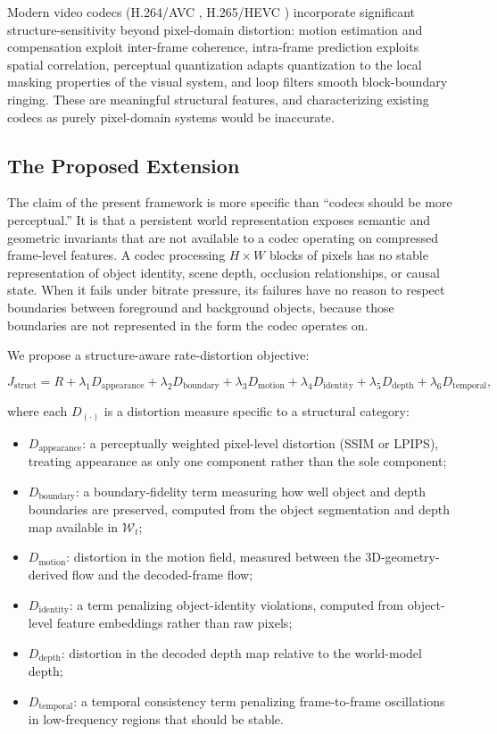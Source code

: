 \documentclass[12pt,a4paper]{article}
\theoremstyle{plain}
\theoremstyle{definition}
\theoremstyle{remark}
\begin{document}
Modern video codecs (H.264/AVC \cite{wiegand2003}, H.265/HEVC \cite{sullivan2012}) incorporate significant structure-sensitivity beyond pixel-domain distortion: motion estimation and compensation exploit inter-frame coherence, intra-frame prediction exploits spatial correlation, perceptual quantization adapts quantization to the local masking properties of the visual system, and loop filters smooth block-boundary ringing. These are meaningful structural features, and characterizing existing codecs as purely pixel-domain systems would be inaccurate.

\subsection{The Proposed Extension}

The claim of the present framework is more specific than ``codecs should be more perceptual.'' It is that a persistent world representation exposes semantic and geometric invariants that are not available to a codec operating on compressed frame-level features. A codec processing $H \times W$ blocks of pixels has no stable representation of object identity, scene depth, occlusion relationships, or causal state. When it fails under bitrate pressure, its failures have no reason to respect boundaries between foreground and background objects, because those boundaries are not represented in the form the codec operates on.

We propose a structure-aware rate-distortion objective:

\[
J_{\mathrm{struct}} = R + \lambda_1 D_{\mathrm{appearance}} + \lambda_2 D_{\mathrm{boundary}} + \lambda_3 D_{\mathrm{motion}} + \lambda_4 D_{\mathrm{identity}} + \lambda_5 D_{\mathrm{depth}} + \lambda_6 D_{\mathrm{temporal}},
\]

where each $D_{\mathrm{(\cdot)}}$ is a distortion measure specific to a structural category:

\begin{itemize}[leftmargin=2em,itemsep=2pt]
\item $D_{\mathrm{appearance}}$: a perceptually weighted pixel-level distortion (SSIM \cite{wang2004ssim} or LPIPS), treating appearance as only one component rather than the sole component;
\item $D_{\mathrm{boundary}}$: a boundary-fidelity term measuring how well object and depth boundaries are preserved, computed from the object segmentation and depth map available in $\mathcal{W}_t$;
\item $D_{\mathrm{motion}}$: distortion in the motion field, measured between the 3D-geometry-derived flow and the decoded-frame flow;
\item $D_{\mathrm{identity}}$: a term penalizing object-identity violations, computed from object-level feature embeddings rather than raw pixels;
\item $D_{\mathrm{depth}}$: distortion in the decoded depth map relative to the world-model depth;
\item $D_{\mathrm{temporal}}$: a temporal consistency term penalizing frame-to-frame oscillations in low-frequency regions that should be stable.
\end{itemize}
\end{document}
